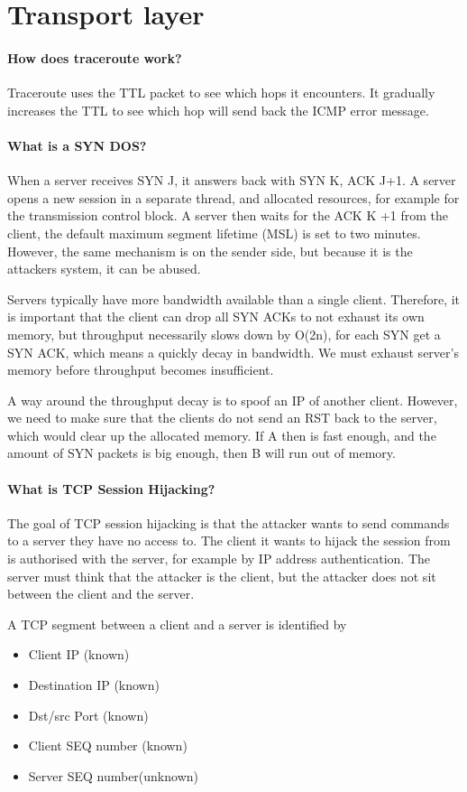 \section{Transport layer}
\paragraph{How does traceroute work?}
Traceroute uses the TTL packet to see which hops it encounters. It gradually increases the TTL to see which hop will send back the ICMP error message.

\paragraph{What is a SYN DOS?}
When a server receives SYN J, it answers back with SYN K, ACK J+1. A server opens a new session in a separate thread, and allocated resources, for example for the transmission control block. A server then waits for the ACK K +1 from the client, the default maximum segment lifetime (MSL) is set to two minutes. However, the same mechanism is on the sender side, but because it is the attackers system, it can be abused.

Servers typically have more bandwidth available than a single client. Therefore, it is important that the client can drop all SYN ACKs to not exhaust its own memory, but throughput necessarily slows down by O(2n), for each SYN get a SYN ACK, which means a quickly decay in bandwidth. We must exhaust server's memory before throughput becomes insufficient.

A way around the throughput decay is to spoof an IP of another client. However, we need to make sure that the clients do not send an RST back to the server, which would clear up the allocated memory. If A then is fast enough, and the amount of SYN packets is big enough, then B will run out of memory.

\paragraph{What is TCP Session Hijacking?}
The goal of TCP session hijacking is that the attacker wants to send commands to a server they have no access to. The client it wants to hijack the session from is authorised with the server, for example by IP address authentication. The server must think that the attacker is the client, but the attacker does not sit between the client and the server.

A TCP segment between a client and a server is identified by
\begin{itemize}
	\item Client IP (known)
	\item Destination IP (known)
	\item Dst/src Port (known)
	\item Client SEQ number (known)
	\item Server SEQ number(unknown)
\end{itemize}

